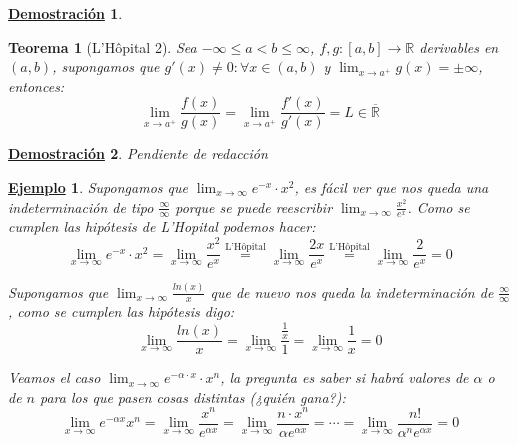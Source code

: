 \documentclass[10pt,a4paper,openright]{book}
\theoremstyle{break}
\newtheorem{theo}{Teorema}[chapter]
\newtheorem*{demo}{\underline{Demostración}}
\newtheorem{ej}{\underline{Ejemplo}}[chapter]
\begin{document}
\begin{demo}



\end{demo}

\begin{theo}[L'Hôpital 2]
Sea $-\infty\leq a < b \leq \infty$, $f,g: [a,b]\rightarrow \mathbb R$ derivables en $(a,b)$, supongamos que $g'(x)\neq 0: \forall x\in (a,b)$ y $\lim_{x\rightarrow a^+}g(x)=\pm\infty$, entonces:
$$\lim_{x\rightarrow a^+}\frac{f(x)}{g(x)}=\lim_{x\rightarrow a^+}\frac{f'(x)}{g'(x)}=L\in \overline{\mathbb R}$$
\end{theo}
\begin{demo}
Pendiente de redacción
\end{demo}

\begin{ej}
Supongamos que $\lim_{x\rightarrow \infty} e^{-x} \cdot x^2$, es fácil ver que nos queda una indeterminación de tipo $\frac{\infty}{\infty}$ porque se puede reescribir $\lim_{x\rightarrow \infty}\frac{x^2}{e^x}$. Como se cumplen las hipótesis de L'Hopital podemos hacer:
$$\lim_{x\rightarrow \infty} e^{-x} \cdot x^2=\lim_{x\rightarrow \infty}\frac{x^2}{e^x}\stackrel{\mbox{L'Hôpital}}{=}\lim_{x\rightarrow \infty}\frac{2x}{e^x}\stackrel{\mbox{L'Hôpital}}{=}\lim_{x\rightarrow \infty}\frac{2}{e^x}=0$$

Supongamos que $\lim_{x\rightarrow \infty}\frac{ln(x)}{x}$ que de nuevo nos queda la indeterminación de $\frac{\infty}{\infty}$, como se cumplen las hipótesis digo:
$$\lim_{x\rightarrow \infty} \frac{ln(x)}{x}=\lim_{x\rightarrow \infty}\frac{\frac{1}{x}}{1}=\lim_{x\rightarrow \infty}\frac{1}{x}=0$$

Veamos el caso $\lim_{x\rightarrow \infty} e^{-\alpha \cdot x}\cdot x^n$, la pregunta es saber si habrá valores de $\alpha$ o de $n$ para los que pasen cosas distintas (¿quién gana?):
$$\lim_{x\rightarrow \infty} e^{-\alpha x}x^n=\lim_{x\rightarrow \infty}\frac{x^n}{e^{\alpha x}}=\lim_{x\rightarrow \infty} \frac{n\cdot x^n}{\alpha e^{\alpha x}}=\cdots =\lim_{x\rightarrow \infty} \frac{n!}{\alpha^n e^{\alpha x}}=0$$
\end{ej}
\end{document}
